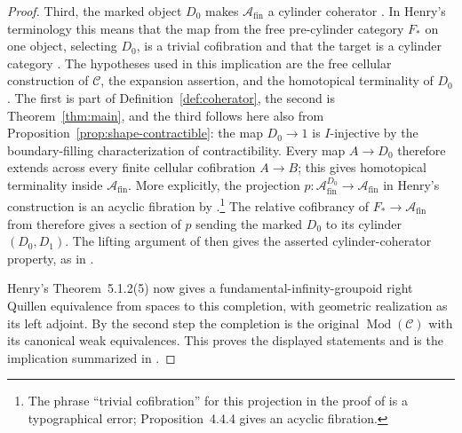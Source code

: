 \documentclass[11pt,letterpaper]{article}
\numberwithin{equation}{section}
\theoremstyle{plain}
\theoremstyle{definition}
\theoremstyle{remark}
\DeclareMathOperator{\Mod}{Mod}
\begin{document}
\begin{proof}
Third, the marked object \(D_0\) makes
\(\mathcal A_{\mathrm{fin}}\) a cylinder coherator
\cite[Corollary~5.3.12]{Henry2016}.  In Henry's terminology this
means that the map from the free pre-cylinder category \(F_*\) on one object,
selecting \(D_0\), is a trivial cofibration and that the target is a
cylinder category \cite[Definition~5.1.1]{Henry2016}.
The hypotheses used in this implication are the
free cellular construction of \(\mathcal C\), the expansion
assertion, and the homotopical terminality of \(D_0\).  The first is
part of Definition~\ref{def:coherator}, the second is
Theorem~\ref{thm:main}, and the third follows here also from
Proposition~\ref{prop:shape-contractible}: the map \(D_0\to1\)
is \(I\)-injective by the boundary-filling characterization of
contractibility.  Every map \(A\to D_0\) therefore extends across
every finite cellular cofibration \(A\to B\); this gives
homotopical terminality inside \(\mathcal A_{\mathrm{fin}}\).
More explicitly, the projection
\(p:\mathcal A_{\mathrm{fin}}^{D_0}\to\mathcal A_{\mathrm{fin}}\)
in Henry's construction is an acyclic fibration by
\cite[Proposition~4.4.4]{Henry2016}.\footnote{The phrase
``trivial cofibration'' for this projection in the proof of
\cite[Lemma~5.3.11]{Henry2016} is a typographical error;
Proposition~4.4.4 gives an acyclic fibration.}
The relative cofibrancy of \(F_*\to\mathcal A_{\mathrm{fin}}\)
from \cite[Proposition~5.3.7]{Henry2016} therefore gives a section
of \(p\) sending the marked \(D_0\) to its cylinder \((D_0,D_1)\).
The lifting argument of \cite[Lemma~5.3.9]{Henry2016} then gives
the asserted cylinder-coherator property, as in
\cite[Lemma~5.3.11 and Corollary~5.3.12]{Henry2016}.

Henry's Theorem~5.1.2(5) now gives a fundamental-infinity-groupoid
right Quillen equivalence from spaces to this completion, with
geometric realization as its left adjoint.  By the second step the
completion is the original \(\Mod(\mathcal C)\) with its canonical
weak equivalences.  This proves the displayed statements and is the
implication summarized in \cite[Corollary~5.3.13]{Henry2016}.
\end{proof}



\end{document}
